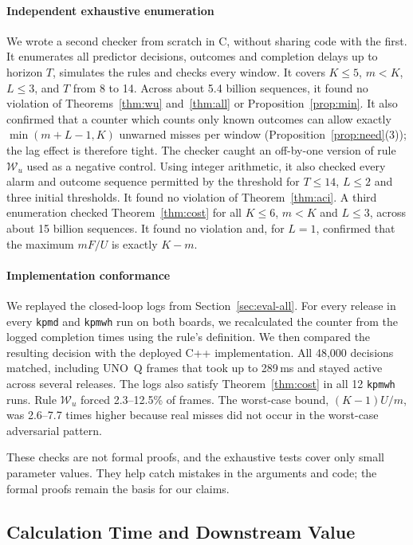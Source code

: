 \documentclass[acmsmall,screen]{acmart}
\newcommand{\pol}[1]{\texttt{#1}}
\newcommand{\Wu}{$\mathcal{W}_u$}
\begin{document}
\paragraph{Independent exhaustive enumeration} We wrote a second checker from scratch in C, without sharing code with the first. It enumerates all predictor decisions, outcomes and completion delays up to horizon $T$, simulates the rules and checks every window. It covers $K\le5$, $m<K$, $L\le3$, and $T$ from 8 to 14. Across about 5.4 billion sequences, it found no violation of Theorems~\ref{thm:wu} and~\ref{thm:all} or Proposition~\ref{prop:min}. It also confirmed that a counter which counts only known outcomes can allow exactly $\min(m+L-1,K)$ unwarned misses per window (Proposition~\ref{prop:need}(3)); the lag effect is therefore tight. The checker caught an off-by-one version of rule \Wu{} used as a negative control. Using integer arithmetic, it also checked every alarm and outcome sequence permitted by the threshold for $T\le14$, $L\le2$ and three initial thresholds. It found no violation of Theorem~\ref{thm:aci}. A third enumeration checked Theorem~\ref{thm:cost} for all $K\le6$, $m<K$ and $L\le3$, across about 15 billion sequences. It found no violation and, for $L=1$, confirmed that the maximum $mF/U$ is exactly $K-m$.

\paragraph{Implementation conformance} We replayed the closed-loop logs from Section~\ref{sec:eval-all}. For every release in every \pol{kpmd} and \pol{kpmwh} run on both boards, we recalculated the counter from the logged completion times using the rule's definition. We then compared the resulting decision with the deployed C++ implementation. All 48{,}000 decisions matched, including UNO~Q frames that took up to 289\,ms and stayed active across several releases. The logs also satisfy Theorem~\ref{thm:cost} in all 12 \pol{kpmwh} runs. Rule \Wu{} forced 2.3--12.5\% of frames. The worst-case bound, $(K-1)U/m$, was 2.6--7.7 times higher because real misses did not occur in the worst-case adversarial pattern.

These checks are not formal proofs, and the exhaustive tests cover only small parameter values. They help catch mistakes in the arguments and code; the formal proofs remain the basis for our claims.

\subsection{Calculation Time and Downstream Value}\label{sec:eval-cost}
\end{document}
